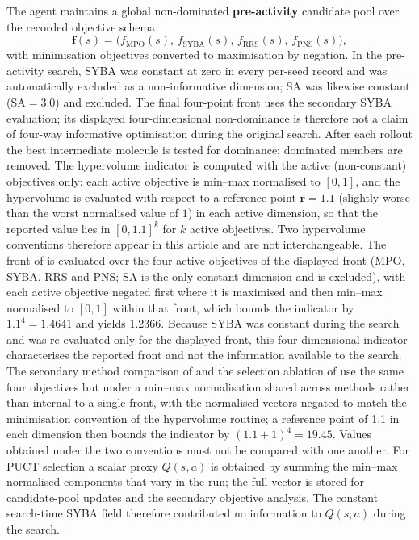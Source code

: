\documentclass[10pt,a4paper]{article}
\begin{document}
The agent maintains a global non-dominated \textbf{pre-activity} candidate pool over the recorded objective schema
\[
\mathbf{f}(s)=\bigl(f_{\text{MPO}}(s),\,f_{\text{SYBA}}(s),\,f_{\text{RRS}}(s),\,f_{\text{PNS}}(s)\bigr),
\]
with minimisation objectives converted to maximisation by negation. In the pre-activity search, SYBA was constant at zero in every per-seed record and was automatically excluded as a non-informative dimension; SA was likewise constant ($\mathrm{SA}=\num{3.0}$) and excluded. The final four-point front uses the secondary SYBA evaluation; its displayed four-dimensional non-dominance is therefore not a claim of four-way informative optimisation during the original search. After each rollout the best intermediate molecule is tested for dominance; dominated members are removed. The hypervolume indicator is computed with the active (non-constant) objectives only: each active objective is min--max normalised to $[0,1]$, and the hypervolume is evaluated with respect to a reference point $\mathbf{r}=\num{1.1}$ (slightly worse than the worst normalised value of $1$) in each active dimension, so that the reported value lies in $[0,1.1]^{k}$ for $k$ active objectives. Two hypervolume conventions therefore appear in this article and are not interchangeable. The front of  is evaluated over the four active objectives of the displayed front (MPO, SYBA, RRS and PNS; SA is the only constant dimension and is excluded), with each active objective negated first where it is maximised and then min--max normalised to $[0,1]$ within that front, which bounds the indicator by $1.1^{4}=\num{1.4641}$ and yields \num{1.2366}. Because SYBA was constant during the search and was re-evaluated only for the displayed front, this four-dimensional indicator characterises the reported front and not the information available to the search. The secondary method comparison of  and the selection ablation of  use the same four objectives but under a min--max normalisation shared across methods rather than internal to a single front, with the normalised vectors negated to match the minimisation convention of the hypervolume routine; a reference point of \num{1.1} in each dimension then bounds the indicator by $(1.1+1)^{4}=\num{19.45}$. Values obtained under the two conventions must not be compared with one another. For PUCT selection a scalar proxy $Q(s,a)$ is obtained by summing the min--max normalised components that vary in the run; the full vector is stored for candidate-pool updates and the secondary objective analysis. The constant search-time SYBA field therefore contributed no information to $Q(s,a)$ during the search.
\end{document}
